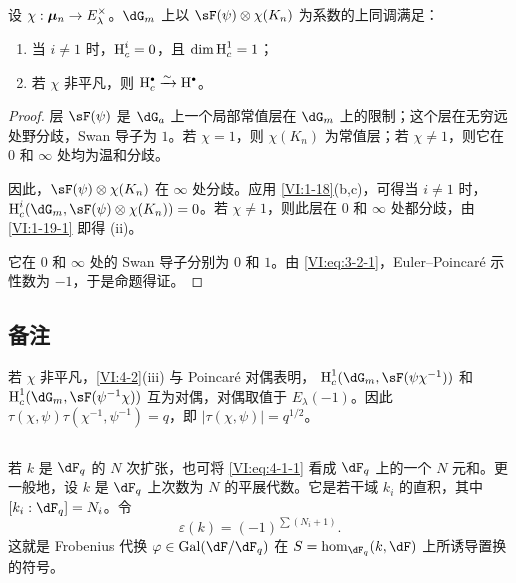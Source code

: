 \begin{proposition_}\label{VI:4-3}
设 $\chi:{\bm\mu}_n\to E_\lambda^\times$。$\dG_m$ 上以 $\sF(\psi)\otimes\chi(K_n)$ 为系数的上同调满足：
\begin{enumerate}[\indent (i)]
\item 当 $i\ne1$ 时，$\operatorname{H}_c^i=0$，且 $\dim\operatorname{H}_c^1=1$；
\item 若 $\chi$ 非平凡，则 $\h_c^\bullet\iso\h^\bullet$。
\end{enumerate}
\end{proposition_}
\begin{proof}
层 $\sF(\psi)$ 是 $\dG_a$ 上一个局部常值层在 $\dG_m$ 上的限制；这个层在无穷远处野分歧，Swan 导子为 $1$。若 $\chi=1$，则 $\chi(K_n)$ 为常值层；若 $\chi\ne1$，则它在 $0$ 和 $\infty$ 处均为温和分歧。

因此，$\sF(\psi)\otimes\chi(K_n)$ 在 $\infty$ 处分歧。应用 \ref{VI:1-18}(b,c)，可得当 $i\ne1$ 时，$\h_c^i(\dG_m,\sF(\psi)\otimes\chi(K_n))=0$。若 $\chi\ne1$，则此层在 $0$ 和 $\infty$ 处都分歧，由 \ref{VI:1-19-1} 即得 (ii)。

它在 $0$ 和 $\infty$ 处的 Swan 导子分别为 $0$ 和 $1$。由 \eqref{VI:eq:3-2-1}，Euler--Poincaré 示性数为 $-1$，于是命题得证。
\end{proof}

\subsection{备注}\label{VI:4-4}
若 $\chi$ 非平凡，\ref{VI:4-2}(iii) 与 Poincaré 对偶表明，
$\h_c^1(\dG_m,\sF(\psi\chi^{-1}))$ 和
$\h_c^1(\dG_m,\sF(\psi^{-1}\chi))$
互为对偶，对偶取值于 $E_\lambda(-1)$。因此
$\tau(\chi,\psi)\tau(\chi^{-1},\psi^{-1})=q$，即
$|\tau(\chi,\psi)|=q^{1/2}$。

\subsection{}\label{VI:4-5}
若 $k$ 是 $\dF_q$ 的 $N$ 次扩张，也可将 \eqref{VI:eq:4-1-1} 看成 $\dF_q$ 上的一个 $N$ 元和。更一般地，设 $k$ 是 $\dF_q$ 上次数为 $N$ 的平展代数。它是若干域 $k_i$ 的直积，其中 $[k_i:\dF_q]=N_i$。令
\begin{equation*}\tag{4.5.1}\label{VI:eq:4-5-1}
\varepsilon(k)=(-1)^{\sum(N_i+1)}.
\end{equation*}
这就是 Frobenius 代换 $\varphi\in\gal(\dF/\dF_q)$ 在
$S=\hom_{\dF_q}(k,\dF)$ 上所诱导置换的符号。

